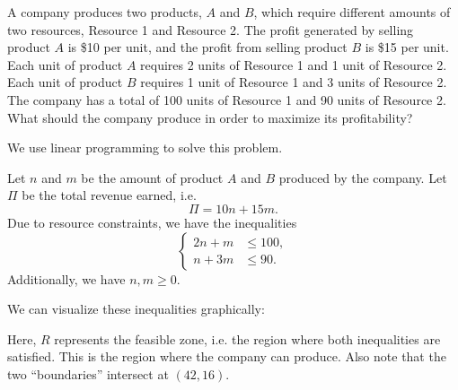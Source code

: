 \begin{problem}
    A company produces two products, $A$ and $B$, which require different amounts of two resources, Resource 1 and Resource 2. The profit generated by selling product $A$ is \$10 per unit, and the profit from selling product $B$ is \$15 per unit. Each unit of product $A$ requires 2 units of Resource 1 and 1 unit of Resource 2. Each unit of product $B$ requires 1 unit of Resource 1 and 3 units of Resource 2. The company has a total of 100 units of Resource 1 and 90 units of Resource 2. What should the company produce in order to maximize its profitability?
\end{problem}
\begin{solution}
    We use linear programming to solve this problem.

    Let $n$ and $m$ be the amount of product $A$ and $B$ produced by the company. Let $\Pi$ be the total revenue earned, i.e. \[\Pi = 10n + 15 m.\] Due to resource constraints, we have the inequalities \[\begin{cases}
        2n + m &\leq 100,\\
        n + 3m &\leq 90.
    \end{cases}\]
    Additionally, we have $n, m \geq 0$.

    We can visualize these inequalities graphically:
    \begin{figure}[H]
        \centering
    \end{figure}
    Here, $R$ represents the feasible zone, i.e. the region where both inequalities are satisfied. This is the region where the company can produce. Also note that the two ``boundaries'' intersect at $(42, 16)$.


\end{solution}
